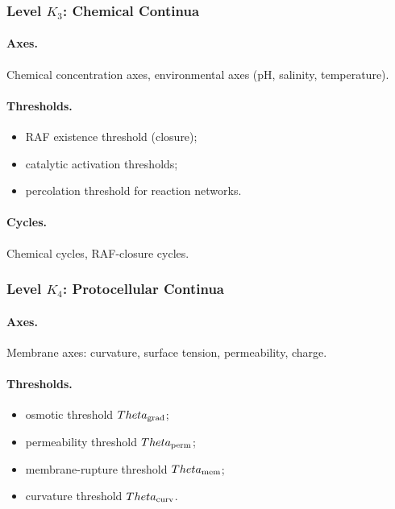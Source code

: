\subsubsection{Level \texorpdfstring{\(K_3\)}{K3}: Chemical Continua}

\paragraph{Axes.}
Chemical concentration axes, environmental axes (pH, salinity, temperature).

\paragraph{Thresholds.}
\begin{itemize}
    \item RAF existence threshold (closure);
    \item catalytic activation thresholds;
    \item percolation threshold for reaction networks.
\end{itemize}

\paragraph{Cycles.}
Chemical cycles, RAF-closure cycles.

\subsubsection{Level \texorpdfstring{\(K_4\)}{K4}: Protocellular Continua}

\paragraph{Axes.}
Membrane axes: curvature, surface tension, permeability, charge.

\paragraph{Thresholds.}
\begin{itemize}
    \item osmotic threshold \(\Theta_{\rm grad}\);
    \item permeability threshold \(\Theta_{\rm perm}\);
    \item membrane-rupture threshold \(\Theta_{\rm mem}\);
    \item curvature threshold \(\Theta_{\rm curv}\).
\end{itemize}

